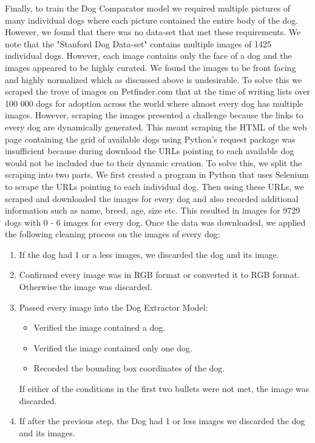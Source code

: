 \documentclass{article}
\begin{document}
Finally, to train the Dog Comparator model we required multiple pictures of many individual dogs where each picture contained the entire body of the dog.  However, we found that there was no data-set that met these requirements.  We note that the "Stanford Dog Data-set" \cite{stanforddogs} contains multiple images of 1425 individual dogs.  However, each image contains only the face of a dog and the images appeared to be highly curated.  We found the images to be front facing and highly normalized which as discussed above is undesirable.  To solve this we scraped the trove of images on Petfinder.com that at the time of writing lists over 100 000 dogs for adoption across the world where almost every dog has multiple images.  However, scraping the images presented a challenge because the links to every dog are dynamically generated.  This meant scraping the HTML of the web page containing the grid of available dogs using Python's request package was insufficient because during download the URLs pointing to each available dog would not be included due to their dynamic creation.  To solve this, we split the scraping into two parts.  We first created a program in Python that uses Selenium to scrape the URLs pointing to each individual dog.  Then using these URLs, we scraped and downloaded the images for every dog and also recorded additional information such as name, breed, age, size etc.  This resulted in images for 9729 dogs with 0 - 6 images for every dog.  Once the data was downloaded, we applied the following cleaning process on the images of every dog:
\begin{enumerate}
  
  \item If the dog had 1 or a less images, we discarded the dog and its image.
  
  \item Confirmed every image was in RGB format or converted it to RGB format.  Otherwise the image was discarded.
  
  \item Passed every image into the Dog Extractor Model:
    \begin{itemize}
      \item Verified the image contained a dog.
      \item Verified the image contained only one dog.
      \item Recorded the bounding box coordinates of the dog.
    \end{itemize}
    If either of the conditions in the first two bullets were not met, the image was discarded.
    
  \item If after the previous step, the Dog had 1 or less images we discarded the dog and its images.
  
\end{enumerate}
\end{document}
